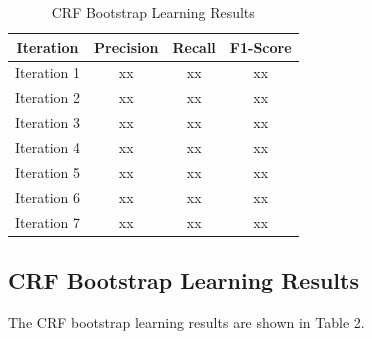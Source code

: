 \documentclass[10pt]{article}
\begin{document}
\begin{table}
\centering
\hspace{-1cm}
\scriptsize
\vspace{0pt}
\begin{tabular}{|c @{\hskip 0.02in}| c | c | c |} %
	\hline %
	 Iteration & Precision & Recall & F1-Score  \\ [0.2ex] %
	\hline \hline
	Iteration 1 & xx & xx & xx  \\
	\hline
	 Iteration 2 & xx & xx & xx  \\
	\hline
	Iteration 3 & xx & xx & xx  \\
	\hline
	Iteration 4 & xx & xx & xx  \\
	\hline
	Iteration 5 & xx & xx & xx  \\
	\hline
	Iteration 6 & xx & xx & xx  \\
	\hline
	Iteration 7 & xx & xx & xx  \\
	\hline %
	\end{tabular} 
	\caption{CRF Bootstrap Learning Results}
	\label{table:bootstrap} %
\end{table} 

\subsection{CRF Bootstrap Learning Results}
The CRF bootstrap learning results are shown in Table 2.
\end{document}
